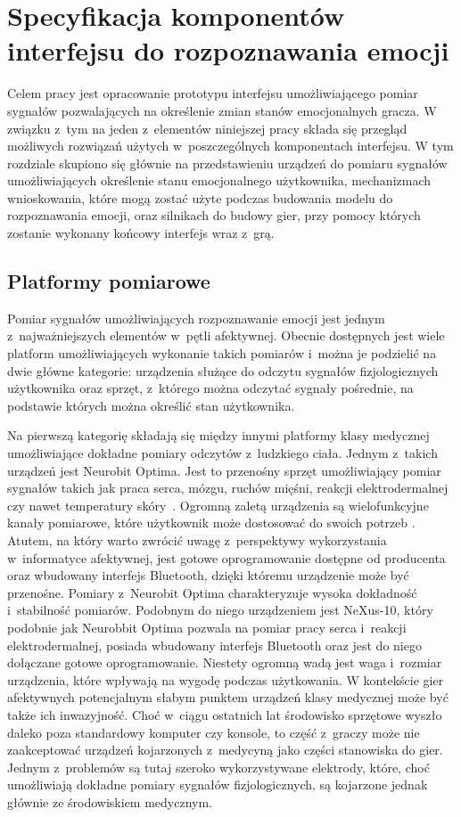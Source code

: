 \chapter{Specyfikacja komponentów interfejsu do rozpoznawania emocji}
\label{cha:specyfikacja}
Celem pracy jest opracowanie prototypu interfejsu umożliwiającego pomiar sygnałów pozwalających na określenie zmian stanów emocjonalnych gracza. W związku z~tym na jeden z~elementów niniejszej pracy składa się przegląd możliwych rozwiązań użytych w~poszczególnych komponentach interfejsu. W tym rozdziale skupiono się głównie na przedstawieniu urządzeń do pomiaru sygnałów umożliwiających określenie stanu emocjonalnego użytkownika, mechanizmach wnioskowania, które mogą zostać użyte podczas budowania modelu do rozpoznawania emocji, oraz silnikach do budowy gier, przy pomocy których zostanie wykonany końcowy interfejs wraz z~grą.

\section{Platformy pomiarowe}
Pomiar sygnałów umożliwiających rozpoznawanie emocji jest jednym z~najważniejszych elementów w~pętli afektywnej. Obecnie dostępnych jest wiele platform umożliwiających wykonanie takich pomiarów i~można je podzielić na dwie główne kategorie: urządzenia służące do odczytu sygnałów fizjologicznych użytkownika oraz sprzęt, z~którego można odczytać sygnały pośrednie, na podstawie których można określić stan użytkownika.

Na pierwszą kategorię składają się między innymi platformy klasy medycznej umożliwiające dokładne pomiary odczytów z~ludzkiego ciała. Jednym z~takich urządzeń jest Neurobit Optima. Jest to przenośny sprzęt umożliwiający pomiar sygnałów takich jak praca serca, mózgu, ruchów mięśni, reakcji elektrodermalnej czy nawet temperatury skóry~\cite{neurobit_manual}. Ogromną zaletą urządzenia są wielofunkcyjne kanały pomiarowe, które użytkownik może dostosować do swoich potrzeb \cite{neurobit_manual}. Atutem, na który warto zwrócić uwagę z~perspektywy wykorzystania w~informatyce afektywnej, jest gotowe oprogramowanie dostępne od producenta oraz wbudowany interfejs Bluetooth, dzięki któremu urządzenie może być przenośne. Pomiary z~Neurobit Optima charakteryzuje wysoka dokładność i~stabilność pomiarów. Podobnym do niego urządzeniem jest NeXus-10, który podobnie jak Neurobbit Optima pozwala na pomiar pracy serca i~reakcji elektrodermalnej, posiada wbudowany interfejs Bluetooth oraz jest do niego dołączane gotowe oprogramowanie. Niestety ogromną wadą jest waga i~rozmiar urządzenia, które wpływają na wygodę podczas użytkowania. W kontekście gier afektywnych potencjalnym słabym punktem urządzeń klasy medycznej może być także ich inwazyjność. Choć w~ciągu ostatnich lat środowisko sprzętowe wyszło daleko poza standardowy komputer czy konsole, to część z~graczy może nie zaakceptować urządzeń kojarzonych z~medycyną jako części stanowiska do gier. Jednym z~problemów są tutaj szeroko wykorzystywane elektrody, które, choć umożliwiają dokładne pomiary sygnałów fizjologicznych, są kojarzone jednak głównie ze środowiskiem medycznym.

